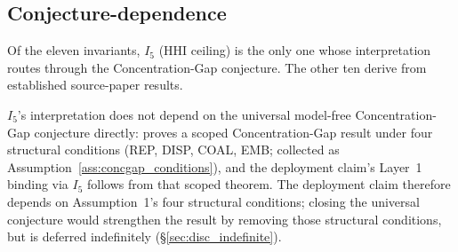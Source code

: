 \subsection{Conjecture-dependence}
\label{sec:conjecture_audit}

Of the eleven invariants, $I_5$ (HHI ceiling) is the only one
whose interpretation routes through the
\citep[Microfoundation]{lasser2026micro} Concentration-Gap
conjecture. The other ten derive from established source-paper
results.

$I_5$'s interpretation does not depend on the universal model-free
Concentration-Gap conjecture directly: \citep[Theorem~2]{lasser2026foundations}
proves a scoped Concentration-Gap result under four structural conditions (REP,
DISP, COAL, EMB; collected as Assumption~\ref{ass:concgap_conditions}), and the
deployment claim's Layer~1 binding via $I_5$ follows from that scoped theorem.
The deployment claim therefore depends on Assumption~1's four
structural conditions; closing the universal conjecture would
strengthen the result by removing those structural conditions, but
is deferred indefinitely (\S\ref{sec:disc_indefinite}).
